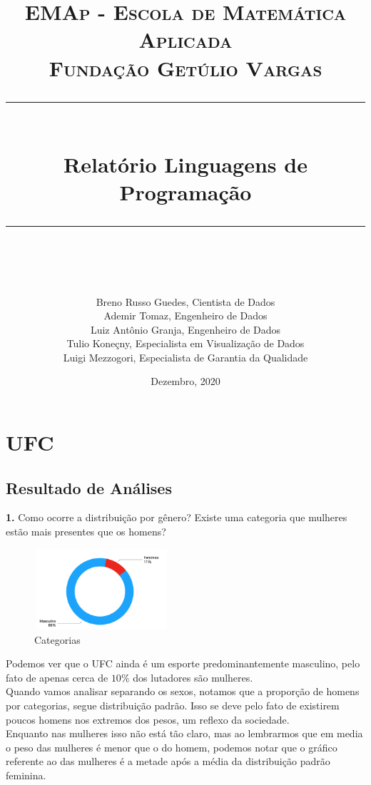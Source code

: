 \documentclass{article}
\title{
\normalfont \normalsize 
\textsc{EMAp - Escola de Matemática Aplicada \\ 
Fundação Getúlio Vargas} \\
[10pt] 
\rule{\linewidth}{1pt} \\[6pt] 
\huge Relatório Linguagens de Programação \\
\rule{\linewidth}{1pt}  \\[6pt]
}
\author{Breno Russo Guedes, Cientista de Dados\\
Ademir Tomaz, Engenheiro de Dados\\
Luiz Antônio Granja, Engenheiro de Dados\\
Tulio Koneçny, Especialista em Visualização de Dados\\
Luigi Mezzogori, Especialista de Garantia da Qualidade\\}
\date{\normalsize {Dezembro, 2020}}
\begin{document}
\maketitle

\section{UFC}
\subsection{Resultado de Análises}
\textbf{1.} Como ocorre a distribuição por gênero? Existe uma categoria que mulheres estão mais presentes que os homens?

\begin{figure}[H]
    \centering
    \includegraphics[width=5cm,height=3cm]{Quantidade de Homens e Mulheres.png}
    \caption{Categorias}
    \label{fig:my_label}
\end{figure}
Podemos ver que o UFC ainda é um esporte predominantemente masculino, pelo fato de apenas cerca de $10\%$ dos lutadores são mulheres.\\

Quando vamos analisar separando os sexos, notamos que a proporção de homens por categorias, segue distribuição padrão. Isso se deve pelo fato de existirem poucos homens nos extremos dos pesos, um reflexo da sociedade.\\

Enquanto nas mulheres isso não está tão claro, mas ao lembrarmos que em media o peso das mulheres é menor que o do homem, podemos notar que o gráfico referente ao das mulheres é a metade após a média da distribuição padrão feminina.\\
\end{document}
